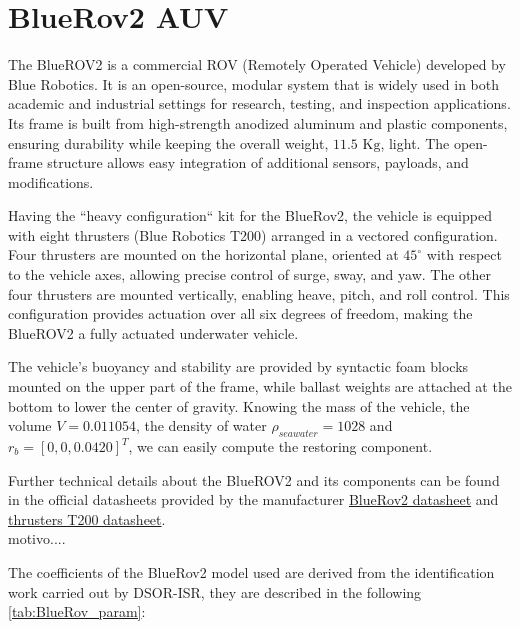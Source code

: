\section{BlueRov2 AUV}
The BlueROV2 is a commercial ROV (Remotely Operated Vehicle) developed by Blue Robotics. It is an open-source, modular system that is widely used in both academic 
and industrial settings for research, testing, and inspection applications. Its frame is built from high-strength anodized aluminum and plastic components, 
ensuring durability while keeping the overall weight, $11.5 \text{ Kg}$, light. The open-frame structure allows easy integration of additional 
sensors, payloads, and modifications.

Having the ``heavy configuration`` kit for the BlueRov2, the vehicle is equipped with eight thrusters (Blue Robotics T200) arranged in a vectored configuration. Four thrusters are mounted on the horizontal plane, 
oriented at $45^\circ$ with respect to the vehicle axes, allowing precise control of surge, sway, and yaw. The other four thrusters are mounted vertically, enabling 
heave, pitch, and roll control. This configuration provides actuation over all six degrees of freedom, making the BlueROV2 a fully actuated underwater vehicle.

The vehicle's buoyancy and stability are provided by syntactic foam blocks mounted on the upper part of the frame, while ballast weights are attached at the bottom to 
lower the center of gravity. Knowing the mass of the vehicle, the volume $V = 0.011054$, the density of water $\rho_{seawater} = 1028$ and $r_b = [0, 0, 0.0420]^T$, 
we can easily compute the restoring component.

Further technical details about the BlueROV2 and its components can be found in the official datasheets provided by the manufacturer \href{https://bluerobotics.com/wp-content/uploads/2017/03/br_bluerov2_datasheet_rev3-bleed-dragged.pdf}{BlueRov2 datasheet} 
and \href{https://cdn.robotshop.com/media/b/blu/rb-blu-27/pdf/rb-blu-27_-_documentation.pdf}{thrusters T200 datasheet}.\\
motivo....

The coefficients of the BlueRov2 model used are derived from the identification work carried out by DSOR-ISR, they are described in the following \ref{tab:BlueRov_param}:

